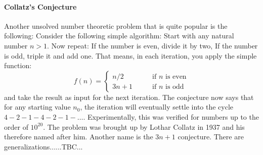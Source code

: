 

% 



\paragraph{Collatz's Conjecture}
Another unsolved number theoretic problem that is quite popular is the following: Consider the following simple algorithm: Start with any natural number $n > 1$. Now repeat: If the number is even, divide it by two, If the number is odd, triple it and add one. That means, in each iteration, you apply the simple function:
\begin{equation}
f(n) = \begin{cases}
n/2    \qquad & \text{if $n$ is even}  \\
3n + 1 \qquad & \text{if $n$ is odd}
\end{cases}
\end{equation}
and take the result as input for the next iteration. The conjecture now says that for any starting value $n_0$, the iteration will eventually settle into the cycle $4-2-1-4-2-1-\ldots$. Experimentally, this was verified for numbers up to the order of $10^{20}$. The problem was brought up by Lothar Collatz in 1937 and his therefore named after him. Another name is the $3n + 1$ conjecture. There are generalizations......TBC...



